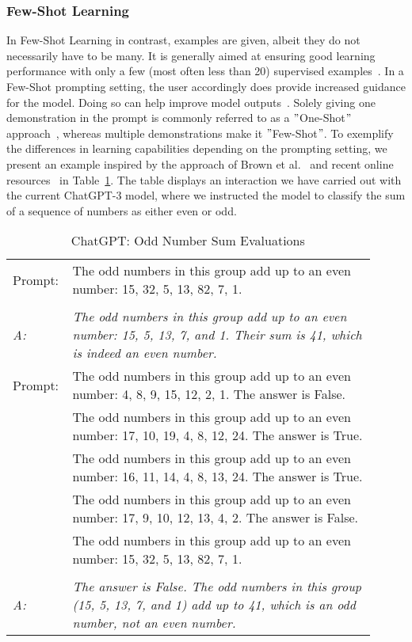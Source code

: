 \subsubsection{Few-Shot Learning}
In Few-Shot Learning in contrast, examples are given, albeit they do not necessarily have to be
many.
It is generally aimed at ensuring good learning performance with only a few (most often less than 20)
supervised examples~\cite[p. 1]{samuel_offline_2022}. %
In a Few-Shot prompting setting, the user accordingly does provide increased guidance for the model.
Doing so can help improve model outputs~\cite[p. 1]{dang_how_2022}.
Solely giving one demonstration in the prompt is commonly referred to as a \("\)One-Shot\("\) approach~\cite[p. 6]{brown_language_2020},
whereas multiple demonstrations make it \("\)Few-Shot\("\).
To exemplify the differences in learning capabilities depending on the prompting setting,
we present an example inspired by the approach of Brown et al\(.\)~\cite{brown_language_2020}
and recent online resources~\cite{dairai_few-shot_2023} in Table~\ref{tab:odd_number_sum}.
The table displays an interaction we have carried out with the current ChatGPT-3 model, where we
instructed the model to classify the sum of a sequence of numbers as either even or odd.

\begin{table}
    \centering
    \caption{ChatGPT: Odd Number Sum Evaluations}
    \begin{tabular}{p{0.1\linewidth}p{0.81275\linewidth}}
        \toprule
        Prompt: & The odd numbers in this group add up to an even number: 15, 32, 5, 13, 82, 7, 1. \\ \\
        \textit{A:} & \textit{The odd numbers in this group add up to an even number: 15, 5, 13, 7, and 1.
        Their sum is 41, which is indeed an even number.}\\
        \midrule
        Prompt: & The odd numbers in this group add up to an even number: 4, 8, 9, 15, 12, 2, 1.
        The answer is False. \\
        & The odd numbers in this group add up to an even number: 17, 10, 19, 4, 8, 12, 24.
        The answer is True. \\
        & The odd numbers in this group add up to an even number: 16, 11, 14, 4, 8, 13, 24.
        The answer is True. \\
        & The odd numbers in this group add up to an even number: 17, 9, 10, 12, 13, 4, 2.
        The answer is False. \\
        & The odd numbers in this group add up to an even number: 15, 32, 5, 13, 82, 7, 1.
        \\ \\
        \textit{A:} & \textit{The answer is False.
        The odd numbers in this group (15, 5, 13, 7, and 1) add up to 41, which is an odd number,
            not an even number.}\\
        \bottomrule
    \end{tabular}
    \label{tab:odd_number_sum}
\end{table}

